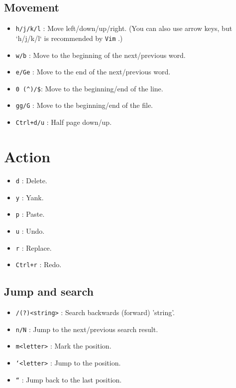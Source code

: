 \documentclass[lang=en,color=blue,12pt]{elegantbook}
\let\oldtexttt\texttt
\renewcommand{\texttt}[1]{%
  \begingroup
  \setlength{\fboxsep}{1pt}%
  \colorbox{gray!10}{\oldtexttt{#1}}%
  \endgroup
}
\begin{document}
\subsection*{\textbf{Movement}}
\begin{itemize}[itemsep=0pt, parsep=0pt, topsep=0pt, partopsep=0pt]
\item \texttt{h/j/k/l}: Move left/down/up/right. (You can also use arrow keys, but `h/j/k/l` is recommended by \texttt{Vim}.) 
\item \texttt{w/b}: Move to the beginning of the next/previous word.
\item \texttt{e/Ge}: Move to the end of the next/previous word.
\item \verb|0 (^)/$|: Move to the beginning/end of the line.
\item \texttt{gg/G}: Move to the beginning/end of the file.
\item \texttt{Ctrl+d/u}: Half page down/up.
\end{itemize}

\section*{\textbf{Action}}

\begin{itemize}[itemsep=0pt, parsep=0pt, topsep=0pt, partopsep=0pt]
\item \texttt{d}: Delete.
\item \texttt{y}: Yank.
\item \texttt{p}: Paste.
\item \texttt{u}: Undo.
\item \texttt{r}: Replace.
\item \texttt{Ctrl+r}: Redo.
\end{itemize}

\subsection*{\textbf{Jump and search}}

\begin{itemize}[itemsep=0pt, parsep=0pt, topsep=0pt, partopsep=0pt]
\item \texttt{/(?)<string>}: Search backwards (forward) 'string'.
\item \texttt{n/N}: Jump to the next/previous search result.
\item \texttt{m<letter>}: Mark the position.
\item \texttt{`<letter>}: Jump to the position.
\item \texttt{``}: Jump back to the last position.
\end{itemize}
\end{document}
